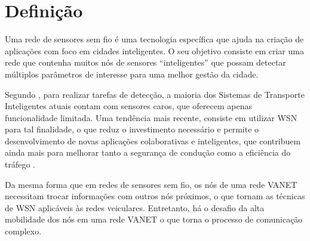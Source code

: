 \documentclass[
	12pt,				%
	oneside,			%
	a4paper,			%
	english,			%
	brazil				%
	]{abntex2ppgsi}
\begin{document}
\section{Definição}
Uma rede de sensores sem fio é uma tecnologia específica que ajuda na criação de aplicações com foco em cidades inteligentes. O seu objetivo consiste em criar uma rede que contenha muitos nós de sensores ``inteligentes'' que possam detectar múltiplos parâmetros de interesse para uma melhor gestão da cidade.

Segundo , para realizar tarefas de detecção, a maioria dos Sistemas de Transporte Inteligentes atuais contam com sensores caros, que oferecem apenas funcionalidade limitada. Uma tendência mais recente, consiste em utilizar WSN para tal finalidade, o que reduz o investimento necessário e permite o desenvolvimento de novas aplicações colaborativas e inteligentes, que contribuem ainda mais para melhorar tanto a segurança de condução como a eficiência do tráfego \cite{losilla2011comprehensive}.

Da mesma forma que em redes de sensores sem fio, os nós de uma rede VANET necessitam trocar informações com outros nós próximos, o que tornam as técnicas de WSN aplicáveis às redes veiculares. Entretanto, há o desafio da alta mobilidade dos nós em uma rede VANET o que torna o processo de comunicação complexo.


\end{document}
